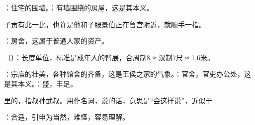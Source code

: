 {
\item {}：住宅的围墙。：有墙围绕的房屋，这是其本义。

子贡有此一比，也许是他和子服景伯正在鲁宫附近，就顺手一指。

\item {}：房舍，这属于普通人家的资产。

\item {}（）：长度单位，标准是成年人的臂展，合周制8  ≈ 汉制7尺 ≈ 1.6米。

\item {}：宗庙的壮美，各种馆舍的齐备，这是王侯之家的气象。：官舍，官吏办公处，这是其本义。：盛，丰足。

\item {}里的，指叔孙武叔。用作名词，说的话，意思是“会这样说”，近似于  

\item {}：合适，引申为当然，难怪，容易理解。
}
{}


